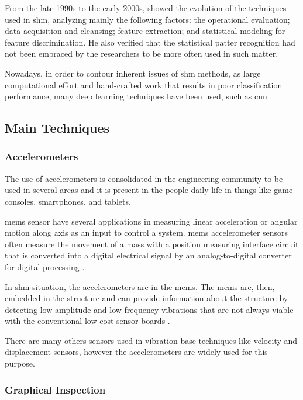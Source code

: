 From the late 1990s to the early 2000s, \citet{sohn2003} showed the evolution of the techniques used in \gls*{shm}, analyzing mainly the following factors: the operational evaluation; data acquisition and cleansing; feature extraction; and statistical modeling for feature discrimination. 
He also verified that the statistical patter recognition had not been embraced by the researchers to be more often used in such matter.

Nowadays, in order to contour inherent issues of \gls*{shm} methods, as large computational effort and hand-crafted work that results in poor classification performance, many deep learning techniques have been used, such as \gls*{cnn} \citep{avci2017}.

\subsection{Main Techniques}\label{sec:shm_main_techniques}

\subsubsection*{Accelerometers}

The use of accelerometers is consolidated in the engineering community to be used in several areas and it is present in the people daily life in things like game consoles, smartphones, and tablets.

\gls*{mems} sensor have several applications in measuring linear acceleration or angular motion along axis as an input to control a system.
\gls*{mems} accelerometer sensors often measure the movement of a mass with a position measuring interface circuit that is converted into a digital electrical signal by an analog-to-digital converter for digital processing \citep{dadafshar2014}.

In \gls*{shm} situation, the accelerometers are in the \gls*{mems}. The \gls*{mems} are, then, embedded in the structure and can provide information about the structure by detecting low-amplitude and low-frequency vibrations that are not always viable with the conventional low-cost sensor boards \citep{sabato2017}.

There are many others sensors used in vibration-base techniques like velocity and displacement sensors, however the accelerometers are widely used for this purpose.

\subsubsection*{Graphical Inspection} 

